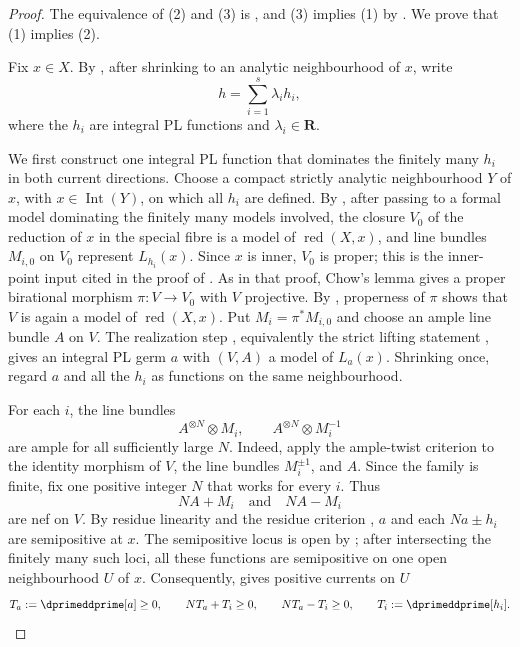 \begin{proof}
The equivalence of (2) and (3) is
\cite[Proposition~7.1]{GJR26}, and (3) implies (1) by
\cite[Theorem~7.14]{GJR26}.  We prove that (1) implies (2).

Fix $x\in X$.  By \cite[Proposition~5.8 and Lemma~5.10]{GJR26}, after
shrinking to an analytic neighbourhood of $x$, write
\begin{equation}
\label{eq:p01-real-pl-decomposition}
                         h=\sum_{i=1}^{s}\lambda_i h_i,
\end{equation}
where the $h_i$ are integral PL functions and
$\lambda_i\in\mathbf R$.

We first construct one integral PL function that dominates the finitely
many $h_i$ in both current directions.  Choose a compact strictly analytic
neighbourhood $Y$ of $x$, with $x\in\operatorname{Int}(Y)$, on which all
$h_i$ are defined.  By \cite[Corollary~5.9 and \S6.16]{GJR26}, after passing
to a formal model dominating the finitely many models involved, the closure
$V_0$ of the reduction of $x$ in the special fibre is a model of
$\operatorname{red}(X,x)$, and line bundles $M_{i,0}$ on $V_0$ represent
$L_{h_i}(x)$.  Since $x$ is inner, $V_0$ is proper; this is the inner-point
input cited in the proof of \cite[Proposition~7.10]{GJR26}.  As in that
proof, Chow's lemma gives a proper birational morphism
$\pi:V\to V_0$ with $V$ projective.  By \cite[\S6.2]{GJR26}, properness of
$\pi$ shows that $V$ is again a model of $\operatorname{red}(X,x)$.  Put
$M_i=\pi^*M_{i,0}$ and choose an ample line bundle $A$ on $V$.  The
realization step \cite[\S6.6.5]{CLD12}, equivalently the strict lifting
statement \cite[Theorem~17.5.7(b)]{CLD25}, gives an integral PL germ $a$
with $(V,A)$ a model of $L_a(x)$.  Shrinking once, regard $a$ and all the
$h_i$ as functions on the same neighbourhood.

For each $i$, the line bundles
\[
                         A^{\otimes N}\otimes M_i,
             \qquad     A^{\otimes N}\otimes M_i^{-1}
\]
are ample for all sufficiently large $N$.  Indeed, apply the ample-twist
criterion \cite[Tag~0892]{stacks-project} to the identity morphism of $V$,
the line bundles $M_i^{\pm1}$, and $A$.  Since the family is finite, fix one
positive integer $N$ that works for every $i$.  Thus
\begin{equation}
\label{eq:p01-ample-domination-residues}
                       NA+M_i\quad\text{and}\quad NA-M_i
\end{equation}
are nef on $V$.  By residue linearity \cite[Lemma~6.18]{GJR26} and the
residue criterion \cite[Proposition~7.1]{GJR26}, $a$ and each $Na\pm h_i$
are semipositive at $x$.  The semipositive locus is open by
\cite[Remark~7.3(4)]{GJR26}; after intersecting the finitely many such loci,
all these functions are semipositive on one open neighbourhood $U$ of $x$.
Consequently, \cite[Theorem~7.14]{GJR26} gives positive currents on $U$
\begin{equation}
\label{eq:p01-current-domination}
 T_a:=\dprimeddprime[a]\geq0,
 \qquad NT_a+T_i\geq0,
 \qquad NT_a-T_i\geq0,
 \qquad T_i:=\dprimeddprime[h_i].
\end{equation}


\end{proof}
